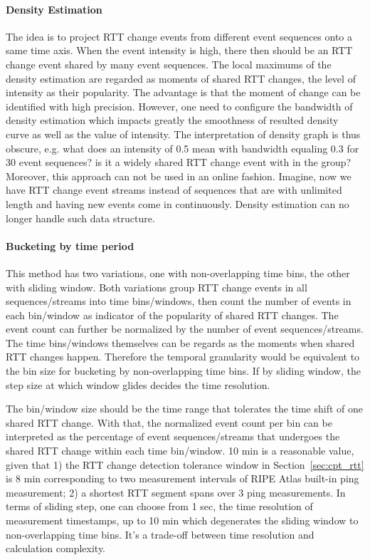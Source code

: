 \paragraph{Density Estimation} The idea is to project RTT change events from different event sequences onto a same time axis. When the event intensity is high, there then should be an RTT change event shared by many event sequences. The local maximums of the density estimation are regarded as moments of shared RTT changes, the level of intensity as their popularity. The advantage is that the moment of change can be identified with high precision. However, one need to configure the bandwidth of density estimation which impacts greatly the smoothness of resulted density curve as well as the value of intensity. The interpretation of density graph is thus obscure, e.g. what does an intensity of 0.5 mean with bandwidth equaling 0.3 for 30 event sequences? is it a widely shared RTT change event with in the group? Moreover, this approach can not be used in an online fashion. Imagine, now we have RTT change event streams instead of sequences that are with unlimited length and having new events come in continuously. Density estimation can no longer handle such data structure.

\paragraph{Bucketing by time period} This method has two variations, one with non-overlapping time bins, the other with sliding window. Both variations group RTT change events in all sequences/streams into time bins/windows, then count the number of events in each bin/window as indicator of the popularity of shared RTT changes. The event count can further be normalized by the number of event sequences/streams. 
The time bins/windows themselves can be regards as the moments when shared RTT changes happen. Therefore the temporal granularity would be equivalent to the bin size for bucketing by non-overlapping time bins. If by sliding window, the step size at which window glides decides the time resolution.

The bin/window size should be the time range that tolerates the time shift of one shared RTT change. With that, the normalized event count per bin can be interpreted as the percentage of event sequences/streams that undergoes the shared RTT change within each time bin/window. 
10 min is a reasonable value, given that 1) the RTT change detection tolerance window in Section~\ref{sec:cpt_rtt} is 8 min corresponding to two measurement intervals of RIPE Atlas built-in ping measurement; 2) a shortest RTT segment spans over 3 ping measurements.
In terms of sliding step, one can choose from 1 sec, the time resolution of measurement timestamps, up to 10 min which degenerates the sliding window to non-overlapping time bins. It's a trade-off between time resolution and calculation complexity.

